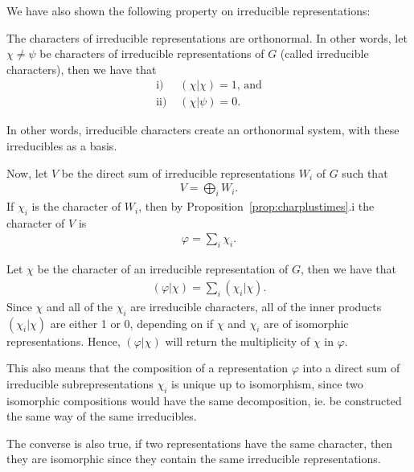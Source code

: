 We have also shown the following property on irreducible representations:

\begin{theorem}\label{thm:irredcrit}
	The characters of irreducible representations are orthonormal. In other words, let $\chi \neq \psi$ be characters of irreducible representations of $G$ (called irreducible characters), then we have that 
	\begin{align*}
		\text{i) }& (\chi|\chi)= 1 \text{, and}  \\
		\text{ii) }& (\chi|\psi) = 0.
	\end{align*}  
\end{theorem}

In other words, irreducible characters create an orthonormal system, with these irreducibles as a basis.

Now, let $V$ be the direct sum of irreducible representations $W_i$ of $G$ such that
\begin{align*}
	V = \bigoplus_i W_i.
\end{align*}
If $\chi_i$ is the character of $W_i$, then by Proposition~\ref{prop:charplustimes}.i the character of $V$ is
\begin{align*}
	\varphi = \sum_i \chi_i.
\end{align*}

Let $\chi$ be the character of an irreducible representation of $G$, then we have that
\begin{align*}
	(\varphi|\chi) = \sum_i (\chi_i|\chi).
\end{align*}
Since $\chi$ and all of the $\chi_i$ are irreducible characters, all of the inner products $(\chi_i|\chi)$ are either 1 or 0, depending on if $\chi$ and $\chi_i$ are of isomorphic representations. Hence, $(\varphi|\chi)$ will return the multiplicity of $\chi$ in $\varphi$. 

\begin{remark}
	This also means that the composition of a representation $\varphi$ into a direct sum of irreducible subrepresentations $\chi_i$ is unique up to isomorphism, since two isomorphic compositions would have the same decomposition, ie. be constructed the same way of the same irreducibles.
\end{remark}

\begin{remark}
	The converse is also true, if two representations have the same character, then they are isomorphic since they contain the same irreducible representations.
\end{remark}

